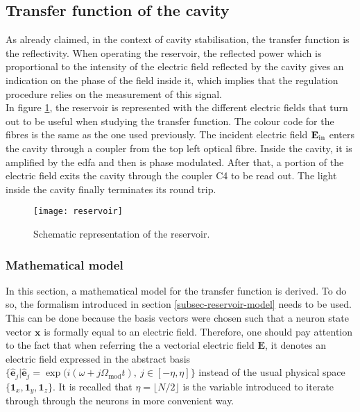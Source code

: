 \subsection{Transfer function of the cavity}

As already claimed, in the context of cavity stabilisation, the transfer function is the reflectivity. When operating the reservoir, the reflected power which is proportional to the intensity of the electric field reflected by the cavity gives an indication on the phase of the field inside it, which implies that the regulation procedure relies on the measurement of this signal. \\

In figure \ref{schematic_reservoir}, the reservoir is represented with the different electric fields that turn out to be useful when studying the transfer function. The colour code for the fibres is the same as the one used previously. The incident electric field $\mathbf{E}_{\text{in}}$ enters the cavity through a coupler from the top left optical fibre. Inside the cavity, it is amplified by the \gls{edfa} and then is phase modulated. After that, a portion of the electric field exits the cavity through the coupler C4 to be read out. The light inside the cavity finally terminates its round trip.

\begin{figure}[h]
	\centering
	\texttt{[image: reservoir]}
	\caption{Schematic representation of the reservoir.}
	\label{schematic_reservoir}
\end{figure}


\subsubsection{Mathematical model}

\label{subsubsec-tf-cavity}

In this section, a mathematical model for the transfer function is derived. To do so, the formalism introduced in section \ref{subsec-reservoir-model} needs to be used. This can be done because the basis vectors were chosen such that a neuron state vector $\mathbf{x}$ is formally equal to an electric field. Therefore, one should pay attention to the fact that when referring the a vectorial electric field $\mathbf{E}$, it denotes an electric field expressed in the abstract basis $\{ \hat{\mathbf{e}}_j | \hat{\mathbf{e}}_j = \exp{ (i (\omega+j\Omega_{\text{mod}}t)}, ~j\in [-\eta, \eta ] \}$ instead of the usual physical space $\{\mathbf{1}_x, \mathbf{1}_y,\mathbf{1}_z \}$. It is recalled that $\eta = \lfloor N/2 \rfloor$ is the variable introduced to iterate through through the neurons in more convenient way.\\

